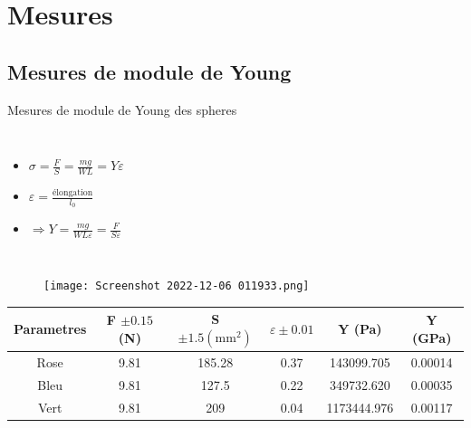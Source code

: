 
\section{Mesures}
\subsection{Mesures de module de Young}
\begin{frame}{Mesures de module de Young des spheres}
    \begin{columns}
            
            \begin{itemize}
                \item \(\sigma = \frac{F}{S} = \frac{mg}{WL} = Y\varepsilon\)
                \item \(\varepsilon = \frac{\mathrm{élongation}}{l_0}\)
                \item \(\Longrightarrow Y = \frac{mg}{WL\varepsilon} = \frac{F}{S\varepsilon}\)
            \end{itemize}
        \end{columns}
\end{frame}

\begin{frame}
    \begin{figure}      %
        \texttt{[image: Screenshot 2022-12-06 011933.png]}
    \end{figure}
    \begin{table}[h]
        \centering
        \begin{tabular}{cccccc}
        \toprule
        \textbf{Parametres} & {F $\pm 0.15$ (N)} & {S \(\pm 1.5(\mathrm{mm}^2)\)} & {$\varepsilon \pm 0.01$} & {Y (Pa)} & {Y (GPa)} \\
        \midrule                                
        \rowcolor{red!10}
        Rose & 9.81 & 185.28 & 0.37 & 143099.705 & 0.00014 \\
        \rowcolor{blue!10}
        Bleu & 9.81 & 127.5  & 0.22 & 349732.620 & 0.00035 \\
        \rowcolor{green!10}
        Vert & 9.81 & 209 & 0.04 & 1173444.976 &   0.00117 \\
        \bottomrule
        \end{tabular}
    \end{table}
\end{frame}

